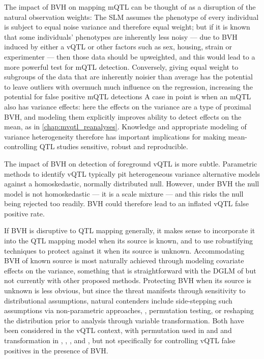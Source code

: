 The impact of BVH on mapping mQTL can be thought of as a disruption of the natural observation weights: The SLM assumes the phenotype of every individual is subject to equal noise variance and therefore equal weight; but if it is known that some individuals' phenotypes are inherently less noisy --- due to BVH induced by either a vQTL or other factors such as sex, housing, strain or experimenter --- then those data should be upweighted, and this would lead to a more powerful test for mQTL detection.
Conversely, giving equal weight to subgroups of the data that are inherently noisier than average has the potential to leave outliers with overmuch much influence on the regression, increasing the potential for false positive mQTL detections
A case in point is when an mQTL also has variance effects: here the effects on the variance are a type of proximal BVH, and modeling them explicitly improves ability to detect effects on the mean, as in \autoref{chap:mvqtl_reanalyses}.
Knowledge and appropriate modeling of variance heterogeneity therefore has important implications for making mean-controlling QTL studies sensitive, robust and reproducible.

The impact of BVH on detection of foreground vQTL is more subtle. Parametric methods to identify vQTL typically pit heterogeneous variance alternative models against a homoskedastic, normally distributed null.
However, under BVH the null model is not homoskedastic --- it is a scale mixture --- and this risks the null being rejected too readily.
BVH could therefore lead to an inflated vQTL false positive rate.

If BVH is disruptive to QTL mapping generally, it makes sense to incorporate it into the QTL mapping model when its source is known, and to use robustifying techniques to protect against it when its source is unknown.
Accommodating BVH of known source is most naturally achieved through modeling covariate effects on the variance, something that is straightforward with the DGLM of \cite{Ronnegard2011a} but not currently with other proposed methods. 
Protecting BVH when its source is unknown is less obvious, but since the threat manifests through sensitivity to distributional assumptions, natural contenders include side-stepping such assumptions via non-parametric approaches, \eg, permutation testing, or reshaping the distribution prior to analysis through variable transformation.
Both have been considered in the vQTL context, with permutation used in \cite{Hulse2013} and \cite{Yang2012} and transformation in \cite{Ronnegard2011a}, \cite{Yang2012}, \cite{Sun2013a}, and \cite{Shen2013a}, but not specifically for controlling vQTL false positives in the presence of BVH.



